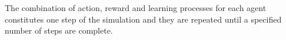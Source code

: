 The combination of action, reward and learning processes for each agent
constitutes one step of the simulation and they are repeated until a specified
number of steps are complete.

%
